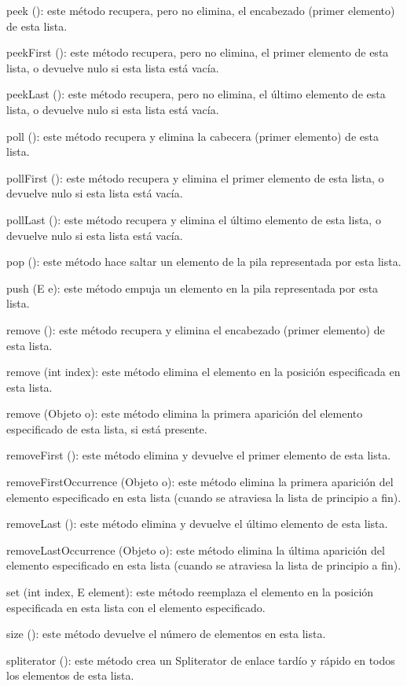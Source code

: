 \documentclass[12pt,a4paper]{report}
\begin{document}
{peek (): este método recupera, pero no elimina, el encabezado (primer elemento) de esta lista.

peekFirst (): este método recupera, pero no elimina, el primer elemento de esta lista, o devuelve nulo si esta lista está vacía.

peekLast (): este método recupera, pero no elimina, el último elemento de esta lista, o devuelve nulo si esta lista está vacía.

poll (): este método recupera y elimina la cabecera (primer elemento) de esta lista.

pollFirst (): este método recupera y elimina el primer elemento de esta lista, o devuelve nulo si esta lista está vacía.

pollLast (): este método recupera y elimina el último elemento de esta lista, o devuelve nulo si esta lista está vacía.

pop (): este método hace saltar un elemento de la pila representada por esta lista.

push (E e): este método empuja un elemento en la pila representada por esta lista.

remove (): este método recupera y elimina el encabezado (primer elemento) de esta lista.

remove (int index): este método elimina el elemento en la posición especificada en esta lista.

remove (Objeto o): este método elimina la primera aparición del elemento especificado de esta lista, si está presente.

removeFirst (): este método elimina y devuelve el primer elemento de esta lista.

removeFirstOccurrence (Objeto o): este método elimina la primera aparición del elemento especificado en esta lista (cuando se atraviesa la lista de principio a fin).

removeLast (): este método elimina y devuelve el último elemento de esta lista.

removeLastOccurrence (Objeto o): este método elimina la última aparición del elemento especificado en esta lista (cuando se atraviesa la lista de principio a fin).

set (int index, E element): este método reemplaza el elemento en la posición especificada en esta lista con el elemento especificado.

size (): este método devuelve el número de elementos en esta lista.

spliterator (): este método crea un Spliterator de enlace tardío y rápido en todos los elementos de esta lista.

}
\end{document}
